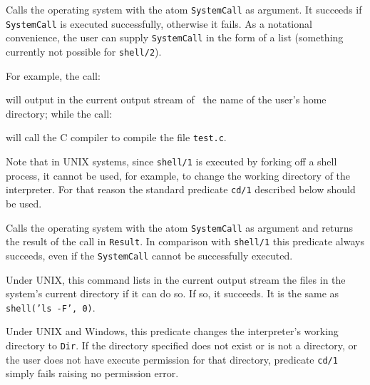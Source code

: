 \begin{description}
    Calls the operating system with the atom {\tt SystemCall} as argument.
    It succeeds if {\tt SystemCall} is executed successfully, otherwise it
    fails.  As a notational convenience, the user can supply {\tt SystemCall} 
    in the form of a list (something currently not possible for {\tt shell/2}).

    For example, the call:


    \noindent
    will output in the current output stream of \ourprolog\ the name of
    the user's home directory; while the call:


    \noindent
    will call the C compiler to compile the file {\tt test.c}.

    Note that in UNIX systems, since {\tt shell/1} is executed by
    forking off a shell process, it cannot be used, for example, to
    change the working directory of the interpreter.  For that reason
    the standard predicate {\tt cd/1} described below should be used.


    Calls the operating system with the atom {\tt SystemCall} as argument
    and returns the result of the call in {\tt Result}.  In comparison with
    {\tt shell/1} this predicate always succeeds, even if the {\tt SystemCall} 
    cannot be successfully executed.


    Under UNIX, this command lists in the current output stream the files 
    in the system's current directory if it can do so.  If so, it succeeds.
    It is the same as {\tt shell('ls -F', 0)}.  

    Under UNIX and Windows, this predicate changes the interpreter's
    working directory to {\tt Dir}.  If the directory specified does
    not exist or is not a directory, or the user does not have execute
    permission for that directory, predicate {\tt cd/1} simply fails
    raising no permission error.


\end{description}
